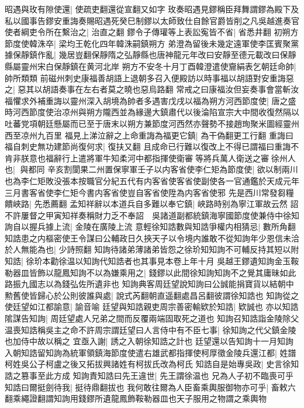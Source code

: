 昭遇與玫有隙使還|{
	使疏吏翻還從宣翻又如字}
玫奏昭遇見鏐稱臣拜舞謂鏐為殿下及私以國事告鏐安重誨奏賜昭遇死癸巳制鏐以太師致仕自餘官爵皆削之凡吳越進奏官使者綱吏令所在繫治之|{
	治直之翻}
鏐令子傳瓘等上表訟寃皆不省|{
	省悉井翻}
初朔方節度使韓洙卒|{
	梁均王乾化四年韓洙嗣鎮朔方}
弟澄為留後未幾定遠軍使李匡賓聚黨據保靜鎮作亂|{
	幾居豈翻保靜隋之弘靜縣也唐神龍元年改曰安靜至德元載改曰保靜縣屬靈州宋白保靜鎮在黄河北岸}
朔方不安冬十月丁酉韓澄遣使齎絹表乞朝廷命帥|{
	帥所類類}
前磁州刺史康福善胡語上退朝多召入便殿訪以時事福以胡語對安重誨惡之|{
	惡其以胡語奏事在左右者莫之曉也惡烏路翻}
常戒之曰康福汝但妄奏事會當斬汝福懼求外補重誨以靈州深入胡境為帥者多遇害戊戌以福為朔方河西節度使|{
	唐之盛時河西節度使治凉州與朔方隴西並為緣邊大鎮肅代以後淪陷宣宗大中間收復然隔以吐蕃党項朝廷懸屬而已至于唐末以朔方兼節度河西然亦聲勢不接趙珣聚米圖經靈州西至凉州九百里}
福見上涕泣辭之上命重誨為福更它鎮|{
	為干偽翻更工行翻}
重誨曰福自刺史無功建節尚復何求|{
	復扶又翻}
且成命已行難以復改上不得已謂福曰重誨不肯非朕意也福辭行上遣將軍牛知柔河中都指揮使衛審等將兵萬人衛送之審徐州人也|{
	與都同}
辛亥割閬果二州置保寧軍壬子以内客省使李仁矩為節度使|{
	欲以制兩川也為李仁矩敗没張本按職官分紀五代有内客省使客省使副使各一官通鑑於天成元年三月書客省使李仁矩今書内客省使豈自客省使陞為内客省使邪}
先是西川常發芻糧饋峽路|{
	先悉薦翻}
孟知祥辭以本道兵自多難以奉它鎮|{
	峽路時别為寧江軍故云然}
詔不許屢督之甲寅知祥奏稱財力乏不奉詔　吳諸道副都統鎮海寧國節度使兼侍中徐知詢自以握兵據上流|{
	金陵在廣陵上流}
意輕徐知誥數與知誥爭權内相猜忌|{
	數所角翻}
知誥患之内樞密使王令謀曰公輔政日久挾天子以令境内誰敢不從知詢年少恩信未洽於人無能為也|{
	少詩照翻}
知詢待諸弟薄諸弟皆怨之徐玠知知詢不可輔反持其短以附知誥|{
	徐玠本勸徐温以知詢代知誥者也其事見本卷上年十月}
吳越王鏐遺知詢金玉鞍勒器皿皆飾以龍鳳知詢不以為嫌乘用之|{
	錢鏐以此間徐知詢知詢不之覺其庸昧如此路振九國志以為錢弘佐所遺非也}
知詢典客周廷望說知詢曰公誠能捐寶貨以結朝中勲舊使皆歸心於公則彼誰與處|{
	說式芮翻朝直遥翻處昌呂翻彼謂徐知誥也}
知詢從之使廷望如江都諭意|{
	諭音喻}
廷望與知誥親吏周宗善密輸欵於知誥|{
	欵誠也}
亦以知誥隂謀告知詢|{
	周廷望處人兄弟之間而反覆兩端固取死之道也}
知詢召知誥詣金陵除父温喪知誥稱吳主之命不許周宗謂廷望曰人言侍中有不臣七事|{
	徐知詢之代父鎮金陵也加侍中故以稱之}
宜亟入謝|{
	誘之入朝徐知誥之計也}
廷望還以告知詢十一月知詢入朝知誥留知詢為統軍領鎮海節度使遣右雄武都指揮使柯厚徵金陵兵還江都|{
	姓譜柯姓吳公子柯盧之後又拓拔興諸姓有柯拔氏改為柯氏}
知誥自是始專吳政|{
	史言徐知誥之篡事至此方成}
知詢責知誥曰先王違世|{
	先王謂徐温也}
兄為人子初不臨喪可乎知誥曰爾挺劍待我|{
	挺待鼎翻拔也}
我何敢往爾為人臣畜乘輿服御物亦可乎|{
	畜敕六翻乘繩證翻謂知詢用錢鏐所遺龍鳳飾鞍勒器皿也天子服用之物謂之乘輿物}
